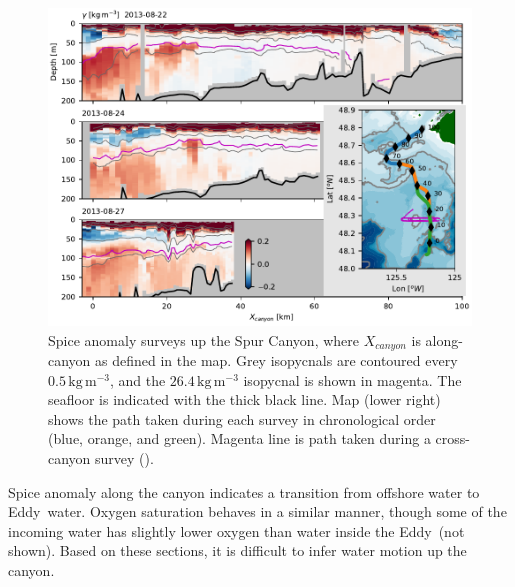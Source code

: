 \documentclass[draft]{agujournal2019}
\newcommand*{\Eddy}{{\sc Eddy}}
\begin{document}
\begin{figure}[htbp]
  \begin{center}
    \includegraphics[width=6.2in]{CanyonPropertiesSpice}
    \caption{Spice anomaly surveys up the Spur Canyon, where $X_{canyon}$ is along-canyon as defined in the map.  Grey isopycnals are contoured every $0.5\,\mathrm{kg\,m^{-3}}$, and the $26.4\,\mathrm{kg\,m^{-3}}$ isopycnal is shown in magenta.  The seafloor is indicated with the thick black line.  Map (lower right) shows the path taken during each survey in chronological order (blue, orange, and green).  Magenta line is path taken during a cross-canyon survey ().
      \label{fig:CanyonPropertiesSpice} }
  \end{center}
\end{figure}

Spice anomaly along the canyon indicates a transition from offshore water to \Eddy\ water.  Oxygen saturation behaves in a similar manner, though some of the incoming water has slightly lower oxygen than water inside the \Eddy\ (not shown).  Based on these sections, it is difficult to infer water motion up the canyon.
\end{document}
